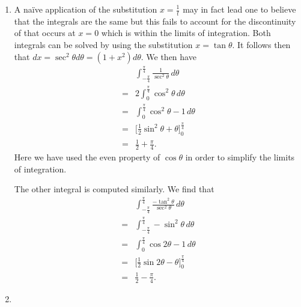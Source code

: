 \documentclass{article}
\begin{document}
\begin{enumerate}
    The second sum does not require us to use a standard trigonometric identity in order to obtain an alternating sum. We can instead multiply immediately by \(\cos\big(\frac{2\pi}{23}\big)\) and use the same product to sum identity to obtain
    \[
    S = \sin(0) +\sin\bigg(\frac{4\pi}{23})-\sin\bigg(\frac{4\pi}{23}\bigg) + \cdots + \sin \bigg(\frac{44\pi}{23}\bigg) = - \sin \bigg(\frac{2\pi}{23}).
    \]
    It is clear from this that the second sum is in fact
    \[
    S = -\tan \bigg( \frac{2\pi}{23} \bigg).
    \]

    \item A na{\"i}ve application of the substitution \(x=\frac{1}{t}\) may in fact lead one to believe that the integrals are the same but this fails to account for the discontinuity of that occurs at \(x=0\) which is within the limits of integration. Both integrals can be solved by using the substitution \(x=\tan \theta\). It follows then that \(dx = \sec^2 \theta d\theta = (1+x^2) d\theta.\) We then have
    \begin{align*}
        &\int_{-\frac{\pi}{4}}^{\frac{\pi}{4}} \frac{1}{\sec^2 \theta} \, d \theta \\
        = & 2 \int_{0}^{\frac{\pi}{4}} \cos^2 \theta \, d\theta \\
        = & \int_{0}^{\frac{\pi}{4}} \cos^2\theta - 1 \, d\theta \\
        = & \bigg[\frac{1}{2}\sin^2\theta + \theta\bigg]^\frac{\pi}{4}_0 \\
        = & \frac{1}{2} + \frac{\pi}{4}.
    \end{align*}
    Here we have used the even property of \(\cos \theta \) in order to simplify the limits of integration.

    The other integral is computed similarly. We find that
    \begin{align*}
        &\int_{-\frac{\pi}{4}}^{\frac{\pi}{4}} \frac{-\tan^2 \theta}{\sec^2 \theta} \, d \theta \\
        = & \int_{-\frac{\pi}{4}}^{\frac{\pi}{4}} -\sin^2 \theta \, d\theta \\
        = & \int_{0}^{\frac{\pi}{4}} \cos 2\theta - 1 \, d\theta \\
        = & \bigg[ \frac{1}{2} \sin 2\theta - \theta\bigg]_0^\frac{\pi}{4} \\
        = & \frac{1}{2} - \frac{\pi}{4}.
    \end{align*}


    \item 


\end{enumerate}
\end{document}
